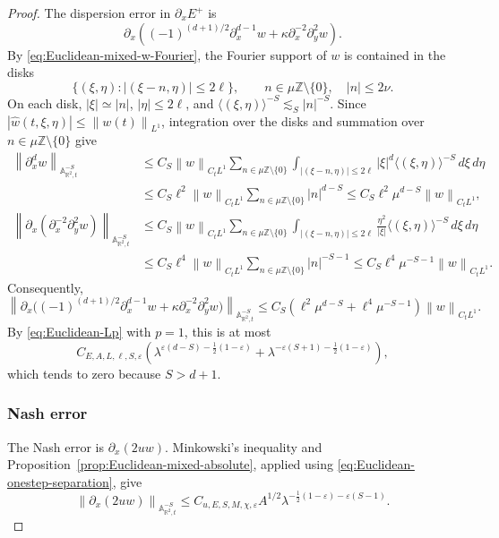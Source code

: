\documentclass[10pt,a4paper]{amsart}
\newcommand{\A}{\mathbb A}
\newcommand{\R}{\mathbb R}
\newcommand{\Z}{\mathbb Z}
\newcommand{\abs}[1]{\left\lvert #1\right\rvert}
\newcommand{\eps}{\varepsilon}
\newcommand{\la}{\lambda}
\newcommand{\norm}[1]{\left\lVert #1\right\rVert}
\begin{document}
\begin{proof}
The dispersion error in $\partial_xE^+$ is
\[
 \partial_x\left((-1)^{(d+1)/2}\partial_x^{d-1}w
 +\kappa\partial_x^{-2}\partial_y^2w\right).
\]
By \eqref{eq:Euclidean-mixed-w-Fourier}, the Fourier support of $w$ is
contained in the disks
\[
 \{(\xi,\eta):\abs{(\xi-n,\eta)}\leq2\ell\},
 \qquad n\in\mu\Z\setminus\{0\},\quad \abs n\leq2\nu.
\]
On each disk, $\abs\xi\simeq\abs n$, $\abs\eta\leq2\ell$, and
$\langle(\xi,\eta)\rangle^{-S}\lesssim_S\abs n^{-S}$.
Since $\abs{\widehat w(t,\xi,\eta)}\leq\norm{w(t)}_{L^1}$, integration
over the disks and summation over $n\in\mu\Z\setminus\{0\}$ give
\begin{align*}
 \norm{\partial_x^dw}_{\A^{-S}_{\R^2,t}}
 &\leq C_S\norm w_{C_tL^1}
 \sum_{n\in\mu\Z\setminus\{0\}}
 \int_{\abs{(\xi-n,\eta)}\leq2\ell}
   \abs\xi^d\langle(\xi,\eta)\rangle^{-S}\,d\xi\,d\eta\\
 &\leq C_S\ell^2\norm w_{C_tL^1}
   \sum_{n\in\mu\Z\setminus\{0\}}\abs n^{d-S}
 \leq C_S\ell^2\mu^{d-S}\norm w_{C_tL^1},\\
 \norm{\partial_x(\partial_x^{-2}\partial_y^2w)}
      _{\A^{-S}_{\R^2,t}}
 &\leq C_S\norm w_{C_tL^1}
 \sum_{n\in\mu\Z\setminus\{0\}}
 \int_{\abs{(\xi-n,\eta)}\leq2\ell}
   \frac{\eta^2}{\abs\xi}\langle(\xi,\eta)\rangle^{-S}
   \,d\xi\,d\eta\\
 &\leq C_S\ell^4\norm w_{C_tL^1}
   \sum_{n\in\mu\Z\setminus\{0\}}\abs n^{-S-1}
 \leq C_S\ell^4\mu^{-S-1}\norm w_{C_tL^1}.
\end{align*}
Consequently,
\begin{equation}\label{eq:Euclidean-onestep-dispersion}
 \norm{\partial_x\bigl((-1)^{(d+1)/2}\partial_x^{d-1}w
       +\kappa\partial_x^{-2}\partial_y^2w)}_{\A^{-S}_{\R^2,t}}
 \leq C_S\left(\ell^2\mu^{d-S}
             +\ell^4\mu^{-S-1}\right)\norm w_{C_tL^1}.
\end{equation}
By \eqref{eq:Euclidean-Lp} with $p=1$, this is at most
\[
 C_{E,A,L,\ell,S,\eps}\left(
 \la^{\eps(d-S)-\frac12(1-\eps)}
 +\la^{-\eps(S+1)-\frac12(1-\eps)}\right),
\]
which tends to zero because $S>d+1$.

\subsubsection*{Nash error}

The Nash error is $\partial_x(2uw)$.  Minkowski's inequality and
Proposition~\ref{prop:Euclidean-mixed-absolute}, applied using
\eqref{eq:Euclidean-onestep-separation}, give
\begin{equation}\label{eq:Euclidean-onestep-Nash}
 \norm{\partial_x(2uw)}_{\A^{-S}_{\R^2,t}}
 \leq C_{u,E,S,M,\chi,\eps}A^{1/2}
 \la^{-\frac12(1-\eps)-\eps(S-1)}.
\end{equation}


\end{proof}
\end{document}
